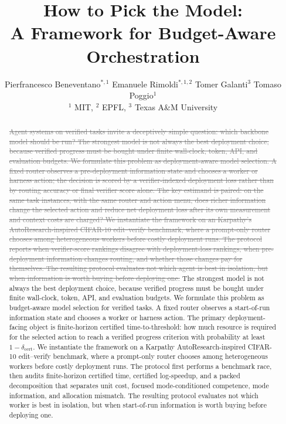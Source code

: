 \documentclass{article}
\title{How to Pick the Model:\\
A Framework for Budget-Aware Orchestration}
\author{%
  \!\!\!\!\!
  Pierfrancesco Beneventano$^{*,1}$ \quad Emanuele Rimoldi$^{*,1,2}$ \quad Tomer Galanti$^3$ \quad Tomaso Poggio$^1$ \\
  $^1$ MIT, $^2$ EPFL, $^3$ Texas A\&M University
}
\newcommand{\oldtext}[1]{\textcolor{gray}{\sout{#1}}}
\newcommand{\newtext}[1]{\textcolor{green!50!black}{#1}}
\begin{document}
\maketitle

\begin{abstract}
\oldtext{Agent systems on verified tasks invite a deceptively simple question: which backbone model should be run? The strongest model is not always the best deployment choice, because verified progress must be bought under finite wall-clock, token, API, and evaluation budgets. We formulate this problem as deployment-aware model selection. A fixed router observes a pre-deployment information state and chooses a worker or harness action; the decision is scored by a verifier-indexed deployment loss rather than by routing accuracy or final verifier score alone. The key estimand is paired: on the same task instances, with the same router and action menu, does richer information change the selected action and reduce net deployment loss after its own measurement and context costs are charged? We instantiate the framework on an Karpathy's AutoResearch-inspired CIFAR-10 edit--verify benchmark, where a prompt-only router chooses among heterogeneous workers before costly deployment runs. The protocol reports when verifier-score rankings disagree with deployment-loss rankings, when pre-deployment information changes routing, and whether those changes pay for themselves. The resulting protocol evaluates not which agent is best in isolation, but when information is worth buying before deploying one.}
\newtext{The strongest model is not always the best deployment choice, because verified progress must be bought under finite wall-clock, token, API, and evaluation budgets. We formulate this problem as budget-aware model selection for verified tasks. A fixed router observes a start-of-run information state and chooses a worker or harness action. The primary deployment-facing object is finite-horizon certified time-to-threshold: how much resource is required for the selected action to reach a verified progress criterion with probability at least \(1-\delta_{\mathrm{cert}}\). We instantiate the framework on a Karpathy AutoResearch-inspired CIFAR-10 edit--verify benchmark, where a prompt-only router chooses among heterogeneous workers before costly deployment runs. The protocol first performs a benchmark race, then audits finite-horizon certified time, certified log-speedup, and a packed decomposition that separates unit cost, focused mode-conditioned competence, mode information, and allocation mismatch. The resulting protocol evaluates not which worker is best in isolation, but when start-of-run information is worth buying before deploying one.}
\end{abstract}
\end{document}
